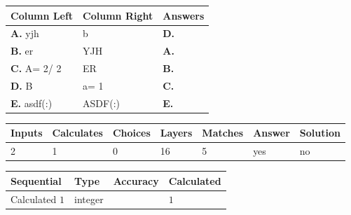 \documentclass[12pt]{article}
\begin{document}
  
 
 
\noindent{}
  
  
\begin{tabular}{|l|l|l|}
 \hline
 Column Left & Column Right  & Answers       \\ 
 \hline
{\textbf{\large{
A.}}}
yjh
  & 
b
 & 
{\textbf{\large{
D.}}}
 \\ 
 \hline
{\textbf{\large{
B.}}}
er
  & 
YJH
 & 
{\textbf{\large{
A.}}}
 \\ 
 \hline
{\textbf{\large{
C.}}}
 A= %
2/ %
2

  & 
ER
 & 
{\textbf{\large{
B.}}}
 \\ 
 \hline
{\textbf{\large{
D.}}}
B
  & 
 a= %
1
 & 
{\textbf{\large{
C.}}}
 \\ 
 \hline
{\textbf{\large{
E.}}}
asdf(:)
  & 
ASDF(:)
 & 
{\textbf{\large{
E.}}}
 \\ 
 \hline
 \end{tabular}
  
  
 
 
\noindent{}
 
 
 
   
   
   
   
\noindent\begin{tabular}{|l|l|l|l|l|l|l|}
 \hline
Inputs & Calculates & Choices & Layers & Matches & Answer & Solution \\ \hline
           2  & 
           1  & 
           0
  & 
          16  & 
           5  & 
  yes & 
  no 
  \\ \hline
 \end{tabular}
   
   
   
   
\noindent{}
   
   
  
  
\noindent\begin{tabular}{|l|l|l|l|}
\hline
 Sequential & Type & Accuracy & Calculated \\ 
\hline
 
 
  Calculated $            1 $ & integer &  & 
  $ 1 $ 
 \\  \hline  
 \end{tabular}
   
\end{document}
